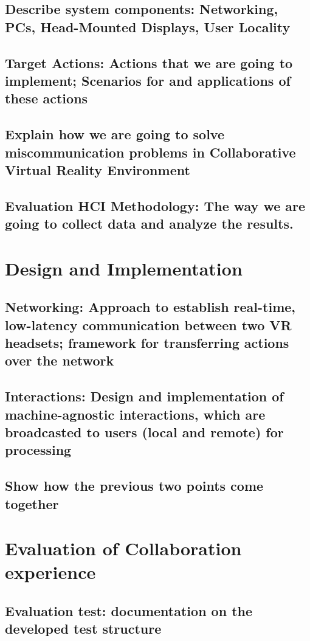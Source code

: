 \section{Describe system components: Networking, PCs, Head-Mounted Displays, User Locality}

\section{Target Actions: Actions that we are going to implement; Scenarios for and applications of these actions}

\section{Explain how we are going to solve miscommunication problems in Collaborative Virtual Reality Environment}

\section{Evaluation HCI Methodology: The way we are going to collect data and analyze the results.}


\chapter{Design and Implementation}
\section{Networking: Approach to establish real-time, low-latency communication between two VR headsets; framework for transferring actions over the network}

\section{Interactions: Design and implementation of machine-agnostic interactions, which are broadcasted to users (local and remote) for processing}

\section{Show how the previous two points come together}


\chapter{Evaluation of Collaboration experience}
\section{Evaluation test: documentation on the developed test structure}

